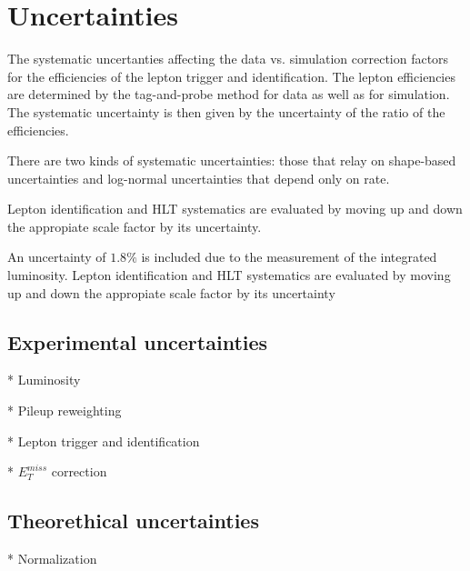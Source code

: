 \section{Uncertainties}

The systematic uncertanties affecting the data vs. simulation correction factors
for the efficiencies of the lepton trigger and identification. The lepton
efficiencies are determined by the tag-and-probe method \cite{tagandprobe} for data as well as for
simulation. The systematic uncertainty is then given by the uncertainty of
the ratio of the efficiencies.

There are two kinds of systematic uncertainties: those that relay on shape-based
uncertainties and log-normal uncertainties that depend only on rate.

Lepton identification and HLT systematics are evaluated by moving up and down
the appropiate scale factor by its uncertainty.

An uncertainty of $1.8\%$ is included due to the measurement of
the integrated luminosity. Lepton identification and HLT systematics are
evaluated by moving up and down the appropiate scale factor by its uncertainty


\subsection{Experimental uncertainties}

* Luminosity

* Pileup reweighting

* Lepton trigger and identification

* $E_{T}^{miss}$ correction

\subsection{Theorethical uncertainties}

* Normalization







